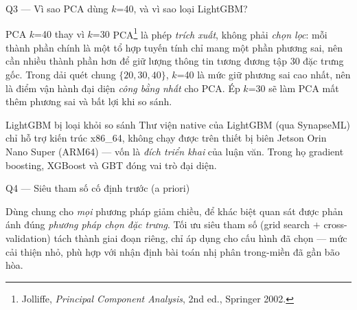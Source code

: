 \documentclass[aspectratio=169, 11pt]{beamer}
\begin{document}
\begin{frame}[label=bk-pca]{Q3 --- Vì sao PCA dùng $k$=40, và vì sao loại LightGBM?}
  \begin{block}{PCA $k$=40 thay vì $k$=30}
    \small
    PCA\footnote{\tiny Jolliffe, \emph{Principal Component Analysis}, 2nd ed.,
    Springer 2002.} là phép \emph{trích xuất}, không phải \emph{chọn lọc}: mỗi thành phần
    chính là một tổ hợp tuyến tính chỉ mang một phần phương sai, nên cần nhiều
    thành phần hơn để giữ lượng thông tin tương đương tập 30 đặc trưng gốc.
    Trong dải quét chung $\{20,30,40\}$, $k$=40 là mức giữ phương sai cao nhất,
    nên là điểm vận hành đại diện \emph{công bằng nhất} cho PCA. Ép $k$=30 sẽ
    làm PCA mất thêm phương sai và bất lợi khi so sánh.
  \end{block}
  \begin{block}{LightGBM bị loại khỏi so sánh}
    \small
    Thư viện native của LightGBM (qua SynapseML) chỉ hỗ trợ kiến trúc x86\_64,
    không chạy được trên thiết bị biên Jetson Orin Nano Super (ARM64) --- vốn là
    \emph{đích triển khai} của luận văn. Trong họ gradient boosting, XGBoost và
    GBT đóng vai trò đại diện.
  \end{block}
\end{frame}

\begin{frame}[label=bk-hparams]{Q4 --- Siêu tham số cố định trước (a priori)}
  \centering\footnotesize
  \\[0.4em]
  \raggedright\footnotesize
  Dùng chung cho \emph{mọi} phương pháp giảm chiều, để khác biệt quan sát được
  phản ánh đúng \emph{phương pháp chọn đặc trưng}. Tối ưu siêu tham số (grid
  search $+$ cross-validation) tách thành giai đoạn riêng, chỉ áp dụng cho cấu
  hình đã chọn --- mức cải thiện nhỏ, phù hợp với nhận định bài toán nhị phân
  trong-miền đã gần bão hòa.
\end{frame}
\end{document}

